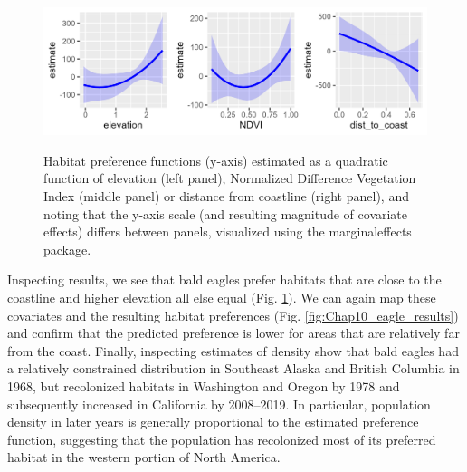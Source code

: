 \begin{figure}[!ht]
    \caption[Habitat preference for bald eagle movement]{Habitat preference functions (y-axis) estimated as a quadratic function of elevation (left panel), Normalized Difference Vegetation Index (middle panel) or distance from coastline (right panel), and noting that the y-axis scale (and resulting magnitude of covariate effects) differs between panels, visualized using the \colorbox{backcolour}{marginaleffects} package.}
    \includegraphics[width=5.5in]{Chap_10/Eagle_covariate_response.png}
    \label{fig:Chap10_eagle_covariate_response}
\end{figure}

Inspecting results, we see that bald eagles prefer habitats that are close to the coastline and higher elevation all else equal (Fig. \ref{fig:Chap10_eagle_covariate_response}). We can again map these covariates and the resulting habitat preferences (Fig. \ref{fig:Chap10_eagle_results}) and confirm that the predicted preference is lower for areas that are relatively far from the coast. Finally, inspecting estimates of density show that bald eagles had a relatively constrained distribution in Southeast Alaska and British Columbia in 1968, but recolonized habitats in Washington and Oregon by 1978 and subsequently increased in California by 2008--2019.  In particular, population density in  later years is generally proportional to the estimated preference function, suggesting that the population has recolonized most of its preferred habitat in the western portion of North America.           

